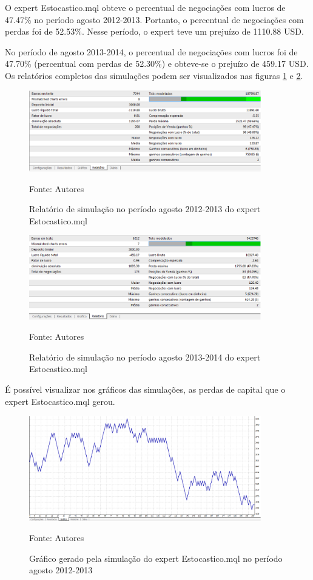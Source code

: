O expert Estocastico.mql obteve o percentual de negociações com lucros de 47.47\% no período agosto 2012-2013. Portanto, o percentual de negociações com perdas foi de 52.53\%. Nesse período, o expert teve um prejuízo de 1110.88 USD.

No período de agosto 2013-2014, o percentual de negociações com lucros foi de 47.70\% (percentual com perdas de 52.30\%)  e obteve-se o prejuízo de 459.17 USD. 
Os relatórios completos das simulações podem ser visualizados nas figuras \ref{protocoloEst} e \ref{protocoloEst2}.

\begin{figure}[htp]
\centering
\includegraphics[width=0.9\textwidth]{figuras/protocoloEst}
\caption{Relatório de simulação no período agosto 2012-2013 do expert Estocastico.mql}{Fonte: Autores} 
\label{protocoloEst}
\end{figure}

\begin{figure}[htp]
\centering
\includegraphics[width=0.9\textwidth]{figuras/protocoloEst2}
\caption{Relatório de simulação no período agosto 2013-2014 do expert Estocastico.mql}{Fonte: Autores} 
\label{protocoloEst2}
\end{figure}

É possível visualizar nos gráficos das simulações, as perdas de capital que o expert Estocastico.mql gerou.

\begin{figure}[htp]
\centering
\includegraphics[width=0.9\textwidth]{figuras/protocoloEst3}
\caption{Gráfico gerado pela simulação do expert Estocastico.mql no período agosto 2012-2013}{Fonte: Autores} 
\label{protocoloEst3}
\end{figure}

